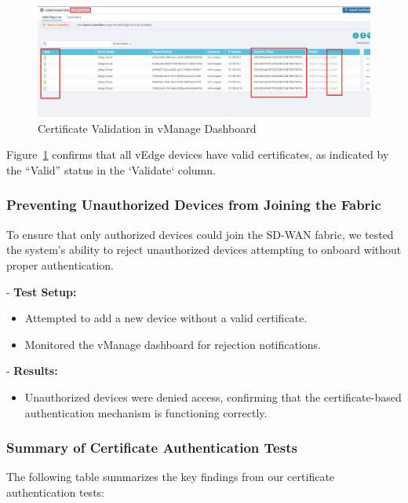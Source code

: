 \documentclass[12pt,english]{report}
\begin{document}
   \begin{figure}[H]
       \centering
       \includegraphics[width=1\textwidth]{chapter 4/vedges-cert.png}
       \caption{Certificate Validation in vManage Dashboard}
       \label{fig:certificate_validation}
   \end{figure}

   Figure~\ref{fig:certificate_validation} confirms that all vEdge devices have valid certificates, as indicated by the “Valid” status in the `Validate` column.

\subsubsection{Preventing Unauthorized Devices from Joining the Fabric} 
To ensure that only authorized devices could join the SD-WAN fabric, we tested the system's ability to reject unauthorized devices attempting to onboard without proper authentication.

- \textbf{Test Setup:}
  \begin{itemize}
      \item Attempted to add a new device without a valid certificate.
      \item Monitored the vManage dashboard for rejection notifications.
  \end{itemize}

- \textbf{Results:}
  \begin{itemize}
      \item Unauthorized devices were denied access, confirming that the certificate-based authentication mechanism is functioning correctly.
  \end{itemize}

\subsubsection{Summary of Certificate Authentication Tests}
The following table summarizes the key findings from our certificate authentication tests:
\end{document}
